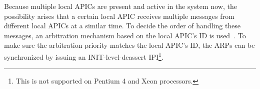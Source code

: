 Because multiple local APICs are present and active in the system now, the possibility arises that a certain local APIC receives multiple messages from different local APICs at a similar time.
To decide the order of handling these messages, an arbitration mechanism based on the local APIC's ID is used~\autocite[sec.~3.11.7]{ia32}.
To make sure the arbitration priority matches the local APIC's ID, the ARPs can be synchronized by issuing an INIT-level-deassert IPI\footnote{
  This is not supported on Pentium 4 and Xeon processors.}.

\cleardoublepage